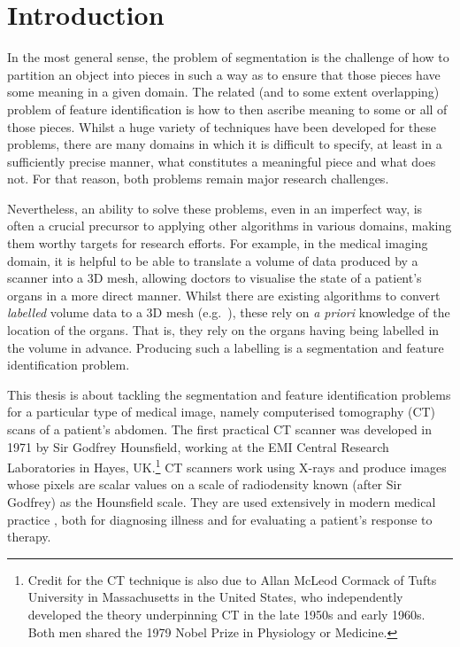 \chapter{Introduction}
\label{chap:introduction}

In the most general sense, the problem of segmentation is the challenge of how to partition an object into pieces in such a way as to ensure that those pieces have some meaning in a given domain. The related (and to some extent overlapping) problem of feature identification is how to then ascribe meaning to some or all of those pieces. Whilst a huge variety of techniques have been developed for these problems, there are many domains in which it is difficult to specify, at least in a sufficiently precise manner, what constitutes a meaningful piece and what does not. For that reason, both problems remain major research challenges.

Nevertheless, an ability to solve these problems, even in an imperfect way, is often a crucial precursor to applying other algorithms in various domains, making them worthy targets for research efforts. For example, in the medical imaging domain, it is helpful to be able to translate a volume of data produced by a scanner into a 3D mesh, allowing doctors to visualise the state of a patient's organs in a more direct manner. Whilst there are existing algorithms to convert \emph{labelled} volume data to a 3D mesh (e.g.~\cite{wu03}), these rely on \emph{a priori} knowledge of the location of the organs. That is, they rely on the organs having being labelled in the volume in advance. Producing such a labelling is a segmentation and feature identification problem.

This thesis is about tackling the segmentation and feature identification problems for a particular type of medical image, namely computerised tomography (CT) scans of a patient's abdomen. The first practical CT scanner was developed in 1971 by Sir Godfrey Hounsfield, working at the EMI Central Research Laboratories in Hayes, UK.\footnote{Credit for the CT technique is also due to Allan McLeod Cormack of Tufts University in Massachusetts in the United States, who independently developed the theory underpinning CT in the late 1950s and early 1960s. Both men shared the 1979 Nobel Prize in Physiology or Medicine.} CT scanners work using X-rays and produce images whose pixels are scalar values on a scale of radiodensity known (after Sir Godfrey) as the Hounsfield scale. They are used extensively in modern medical practice \cite{garvey02}, both for diagnosing illness and for evaluating a patient's response to therapy.

